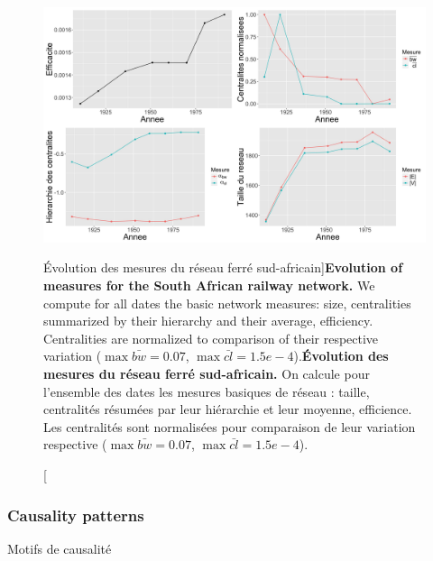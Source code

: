 \begin{figure}[h!]
\includegraphics[width=\linewidth]{Figures/Final/4-2-3-fig-causalityregimes-network.jpg}
\caption[Evolution of measures for the South African railway network][Évolution des mesures du réseau ferré sud-africain]{\textbf{Evolution of measures for the South African railway network.} We compute for all dates the basic network measures: size, centralities summarized by their hierarchy and their average, efficiency. Centralities are normalized to comparison of their respective variation ($\max \bar{bw} = 0.07$, $\max \bar{cl} = 1.5e-4$).\label{fig:causalityregimes:network}}{\textbf{Évolution des mesures du réseau ferré sud-africain.} On calcule pour l'ensemble des dates les mesures basiques de réseau : taille, centralités résumées par leur hiérarchie et leur moyenne, efficience. Les centralités sont normalisées pour comparaison de leur variation respective ($\max \bar{bw} = 0.07$, $\max \bar{cl} = 1.5e-4$).\label{fig:causalityregimes:network}}
\end{figure}



\subsubsection{Causality patterns}{Motifs de causalité}



